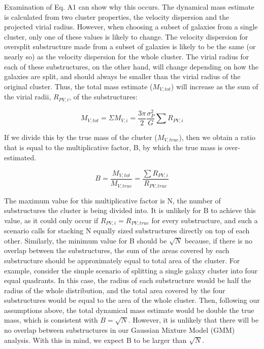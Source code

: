 \documentclass[onecolumn]{aastex}
\begin{document}
Examination of Eq. A1 can show why this occurs.  The dynamical mass estimate is calculated from two cluster properties, the velocity dispersion and the projected virial radius.  However, when choosing a subset of galaxies from a single cluster, only one of these values is likely to change.  The velocity dispersion for oversplit substructure made from a subset of galaxies is likely to be the same (or nearly so) as the velocity dispersion for the whole cluster.  The virial radius for each of these substructures, on the other hand, will change depending on how the galaxies are split, and should always be smaller than the virial radius of the original cluster.  Thus, the total mass estimate ($M_{V,tot}$) will increase as the sum of the virial radii, $R_{PV,i}$, of the substructures:

\begin{equation}
M_{V,tot} =\Sigma M_{V,i} = \frac{3\pi}{2} \frac{\sigma^2_P }{G} \sum R_{PV,i}
\end{equation}

If we divide this by the true mass of the cluster ($M_{V,true}$), then we obtain a ratio that is equal to the multiplicative factor, B, by which the true mass is over-estimated.

\begin{equation}
B = \frac{M_{V,tot}}{M_{V,true}} = \frac{\sum R_{PV,i}}{R_{PV,true}}
\end{equation}

The maximum value for this multiplicative factor is N, the number of substructures the cluster is being divided into.  It is unlikely for B to achieve this value, as it could only occur if $R_{PV,i} = R_{PV,true}$ for every substructure, and such a scenario calls for stacking N equally sized substructures directly on top of each other.  Similarly, the minimum value for B should be $\sqrt{N}$ because, if there is no overlap between the substructures, the sum of the areas covered by each substructure should be approximately equal to total area of the cluster.  For example, consider the simple scenario of splitting a single galaxy cluster into four equal quadrants.  In this case, the radius of each substructure would be half the radius of the whole distribution, and the total area covered by the four substructures would be equal to the area of the whole cluster.  Then, following our assumptions above, the total dynamical mass estimate would be double the true mass, which is consistent with $B = \sqrt{N}$.  However, it is unlikely that there will be no overlap between substructures in our Gaussian Mixture Model (GMM) analysis.  With this in mind, we expect B to be larger than $\sqrt{N}$.
\end{document}
